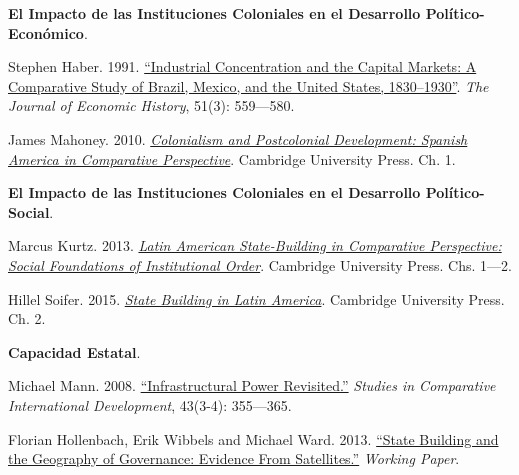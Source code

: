 \documentclass[letterpaper]{article}
\renewenvironment{itemize}{
  \begin{list}{}{
    \setlength{\leftmargin}{1.5em}
  }
}{
  \end{list}
}
\begin{document}
\begin{enumerate}[label=\roman*.]
\begin{itemize}
		\item[6.] {\bf El Impacto de las Instituciones Coloniales en el Desarrollo Pol\'itico-Econ\'omico}.
				\begin{itemize}
					\item[$\circ$] Stephen Haber. 1991. \href{https://github.com/hbahamonde/Ciencia_Politica_II/raw/master/Readings/Haber.pdf}{``Industrial Concentration and the Capital Markets: A Comparative Study of Brazil, Mexico, and the United States, 1830–1930''}. \emph{The Journal of Economic History}, 51(3): 559---580. 
					\item[$\circ$]  James Mahoney. 2010. \href{https://github.com/hbahamonde/Ciencia_Politica_II/raw/master/Readings/Mahoney_Colonialism_PostColonialsm.pdf}{\emph{Colonialism and Postcolonial Development: Spanish America in Comparative Perspective}}. Cambridge University Press. Ch. 1. 
				\end{itemize}

		\item[7.] {\bf El Impacto de las Instituciones Coloniales en el Desarrollo Pol\'itico-Social}.
				\begin{itemize}
					\item[$\circ$]  Marcus Kurtz. 2013. \href{https://github.com/hbahamonde/Ciencia_Politica_II/raw/master/Readings/Kurtz_2013.pdf}{\emph{Latin American State-Building in Comparative Perspective: Social Foundations of Institutional Order}}. Cambridge University Press. Chs. 1---2.
					\item[$\circ$]  Hillel Soifer. 2015. \href{https://github.com/hbahamonde/Ciencia_Politica_II/raw/master/Readings/Soifer.pdf}{\emph{State Building in Latin America}}. Cambridge University Press. Ch. 2.
				\end{itemize}

			\item[8.] {\bf Capacidad Estatal}.
				\begin{itemize}
					\item[$\circ$] Michael Mann. 2008. \href{https://github.com/hbahamonde/Ciencia_Politica_II/raw/master/Readings/Mann_2008.pdf}{``Infrastructural Power Revisited.''} \emph{Studies in Comparative International Development}, 43(3-4): 355---365. 
					\item[$\circ$]  Florian Hollenbach, Erik Wibbels and Michael Ward. 2013. \href{https://github.com/hbahamonde/Ciencia_Politica_II/raw/master/Readings/Hollenbach_2013.pdf}{``State Building and the Geography of Governance: Evidence From Satellites.''} \emph{Working Paper}. 
				\end{itemize}



\end{itemize}
\end{enumerate}
\end{document}
